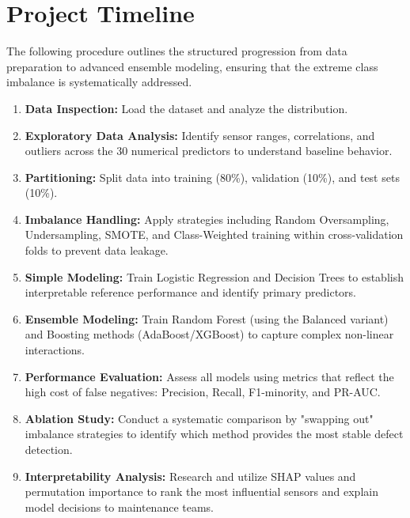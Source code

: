 \documentclass{article}
\begin{document}
\section*{Project Timeline}
 
The following procedure outlines the structured progression from data preparation to advanced ensemble modeling, ensuring that the extreme class imbalance is systematically addressed.
 
\begin{enumerate}
    \item \textbf{Data Inspection:} Load the dataset and analyze the distribution.
    \item \textbf{Exploratory Data Analysis:} Identify sensor ranges, correlations, and outliers across the 30 numerical predictors to understand baseline behavior.
    \item \textbf{Partitioning:} Split data into training (80\%), validation (10\%), and test sets (10\%).
    \item \textbf{Imbalance Handling:} Apply strategies including Random Oversampling, Undersampling, SMOTE, and Class-Weighted training within cross-validation folds to prevent data leakage.
    \item \textbf{Simple Modeling:} Train Logistic Regression and Decision Trees to establish interpretable reference performance and identify primary predictors.
    \item \textbf{Ensemble Modeling:} Train Random Forest (using the Balanced variant) and Boosting methods (AdaBoost/XGBoost) to capture complex non-linear interactions.
    \item \textbf{Performance Evaluation:} Assess all models using metrics that reflect the high cost of false negatives: Precision, Recall, F1-minority, and PR-AUC.
    \item \textbf{Ablation Study:} Conduct a systematic comparison by "swapping out" imbalance strategies to identify which method provides the most stable defect detection.
    \item \textbf{Interpretability Analysis:} Research and utilize SHAP values and permutation importance to rank the most influential sensors and explain model decisions to maintenance teams.
  \end{enumerate}
\end{document}

